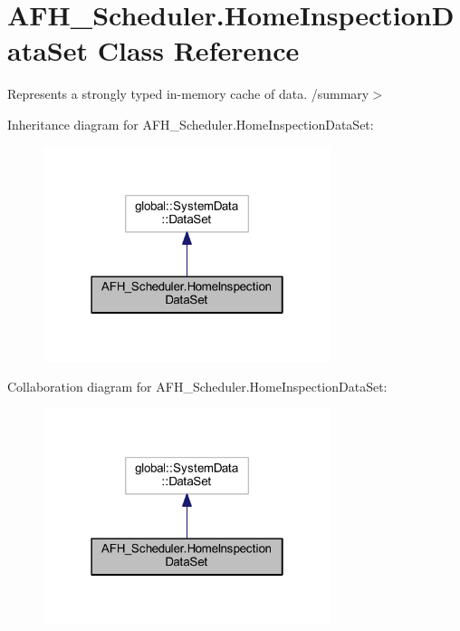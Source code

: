 \section{A\+F\+H\+\_\+\+Scheduler.\+Home\+Inspection\+Data\+Set Class Reference}
\label{class_a_f_h___scheduler_1_1_home_inspection_data_set}


Represents a strongly typed in-\/memory cache of data. /summary$>$  




Inheritance diagram for A\+F\+H\+\_\+\+Scheduler.\+Home\+Inspection\+Data\+Set\+:
\nopagebreak
\begin{figure}[H]
\begin{center}
\leavevmode
\includegraphics[width=238pt]{class_a_f_h___scheduler_1_1_home_inspection_data_set__inherit__graph}
\end{center}
\end{figure}


Collaboration diagram for A\+F\+H\+\_\+\+Scheduler.\+Home\+Inspection\+Data\+Set\+:
\nopagebreak
\begin{figure}[H]
\begin{center}
\leavevmode
\includegraphics[width=238pt]{class_a_f_h___scheduler_1_1_home_inspection_data_set__coll__graph}
\end{center}
\end{figure}
